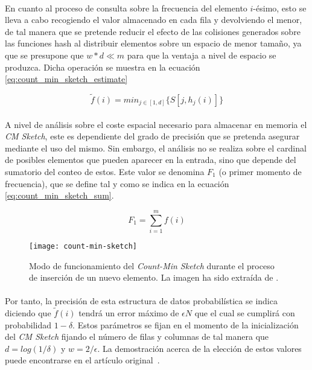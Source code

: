 \documentclass{subfiles}
\begin{document}
      \paragraph{}
      En cuanto al proceso de consulta sobre la frecuencia del elemento $i$-ésimo, esto se lleva a cabo recogiendo el valor almacenado en cada fila y devolviendo el menor, de tal manera que se pretende reducir el efecto de las colisiones generados sobre las funciones hash al distribuir elementos sobre un espacio de menor tamaño, ya que se presupone que $w * d \ll m$ para que la ventaja a nivel de espacio se produzca. Dicha operación se muestra en la ecuación \eqref{eq:count_min_sketch_estimate}

      \begin{equation}
      \label{eq:count_min_sketch_estimate}
        \widetilde{f}(i) = min_{j \in [1,d]}\{S[j, h_j(i)]\}
      \end{equation}

      \paragraph{}
      A nivel de análisis sobre el coste espacial necesario para almacenar en memoria el \emph{CM Sketch}, este es dependiente del grado de precisión que se pretenda asegurar mediante el uso del mismo. Sin embargo, el análisis no se realiza sobre el cardinal de posibles elementos que pueden aparecer en la entrada, sino que depende del sumatorio del conteo de estos. Este valor se denomina $F_1$ (o primer momento de frecuencia), que se define tal y como se indica en la ecuación \eqref{eq:count_min_sketch_sum}.

      \begin{equation}
      \label{eq:count_min_sketch_sum}
        F_1 = \sum_{i=1}^m f(i)
      \end{equation}

      \begin{figure}
        \centering
        \texttt{[image: count-min-sketch]}
        \caption{Modo de funcionamiento del \emph{Count-Min Sketch} durante el proceso de inserción de un nuevo elemento. La imagen ha sido extraída de \cite{cormode2005improved}.}
        \label{fig:count_min_sketch}
      \end{figure}

      \paragraph{}
      Por tanto, la precisión de esta estructura de datos probabilística se indica diciendo que $\widetilde{f}(i)$ tendrá un error máximo de $\epsilon N$ que el cual se cumplirá con probabilidad $1-\delta$. Estos parámetros se fijan en el momento de la inicialización del \emph{CM Sketch} fijando el número de filas y columnas de tal manera que $d = log(1/\delta)$ y $w=2/\epsilon$. La demostración acerca de la elección de estos valores puede encontrarse en el artículo original \cite{cormode2005improved}.
\end{document}
